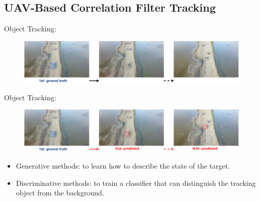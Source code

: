 \documentclass{beamer}
\begin{document}
\subsection{UAV-Based Correlation Filter Tracking}

\begin{frame}
    Object Tracking:
    \begin{figure}[htpb]
        \begin{center}
            \includegraphics[width=1.0\linewidth]{fig/obt0.pdf}
        \end{center}
    \end{figure}
\end{frame}

\begin{frame}
    Object Tracking:
    \begin{figure}[htpb]
        \begin{center}
            \includegraphics[width=1.0\linewidth]{fig/obt1.pdf}
        \end{center}
    \end{figure}
\end{frame}

\begin{frame}
    \begin{itemize}[<+-| alert@+>]
        \item Generative methods: to learn how to describe the state of the target.
        \item Discriminative methods: to train a classifier that can distinguish the tracking object from the background.
    \end{itemize}
\end{frame}
\end{document}
